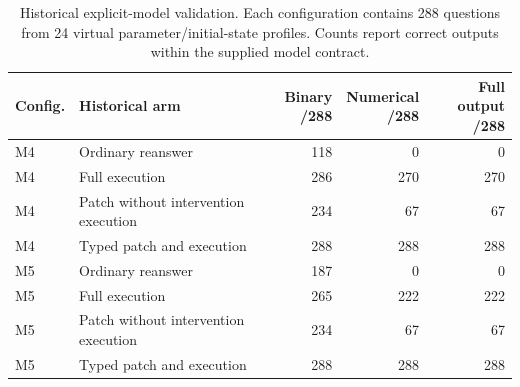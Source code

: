 \begin{table}[htbp]
\centering
\small
\caption{Historical explicit-model validation. Each configuration contains 288 questions from 24
virtual parameter/initial-state profiles. Counts report correct outputs within the
supplied model contract.}
\label{tab:historical_model}
\setlength{\tabcolsep}{5pt}
\begin{tabularx}{\linewidth}{@{}lXrrr@{}}
\toprule
Config. & Historical arm & \shortstack{Binary\\/288} & \shortstack{Numerical\\/288} & \shortstack{Full output\\/288} \\
\midrule
M4 & Ordinary reanswer & 118 & 0 & 0 \\
M4 & Full execution & 286 & 270 & 270 \\
M4 & Patch without intervention execution & 234 & 67 & 67 \\
M4 & Typed patch and execution & 288 & 288 & 288 \\
\addlinespace
M5 & Ordinary reanswer & 187 & 0 & 0 \\
M5 & Full execution & 265 & 222 & 222 \\
M5 & Patch without intervention execution & 234 & 67 & 67 \\
M5 & Typed patch and execution & 288 & 288 & 288 \\
\bottomrule
\end{tabularx}
\end{table}

